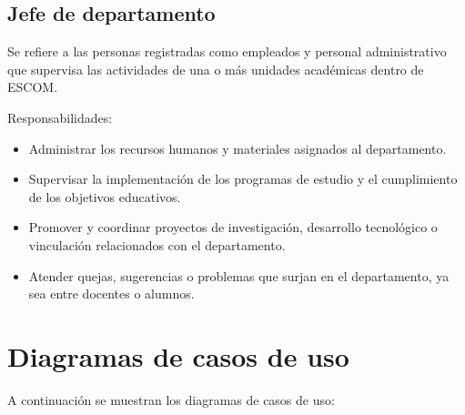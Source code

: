 \begin{Usuario}{\hypertarget{tJefe}{\subsection{Jefe de departamento}}}{
	Se refiere a las personas registradas como empleados y personal administrativo que supervisa las actividades de una o más unidades académicas dentro de ESCOM.
}
\item[Responsabilidades:] \cdtEmpty
\begin{itemize}

	\item Administrar los recursos humanos y materiales asignados al departamento.
	\item Supervisar la implementación de los programas de estudio y el cumplimiento de los objetivos educativos.
	\item Promover y coordinar proyectos de investigación, desarrollo tecnológico o vinculación relacionados con el departamento.
	\item Atender quejas, sugerencias o problemas que surjan en el departamento, ya sea entre docentes o alumnos.
\end{itemize}

\end{Usuario}

\section{Diagramas de casos de uso}

A continuación se muestran los diagramas de casos de uso:

